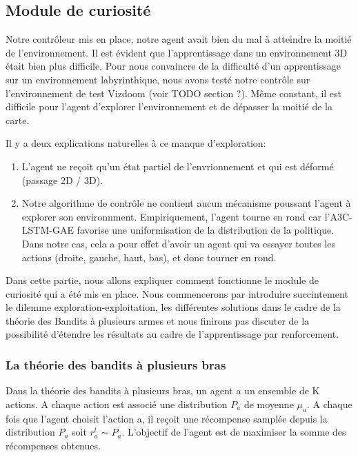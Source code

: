 \subsection{Module de curiosité}

Notre contrôleur mis en place, notre agent avait bien du mal à atteindre la moitié de l'environnement. Il est évident que l'apprentissage dans un environnement 3D était bien plus difficile. Pour nous convaincre de la difficulté d'un apprentissage sur un environnement labyrinthique, nous avons testé notre contrôle sur l'environnement de test Vizdoom (voir TODO section ?). Même constant, il est difficile pour l'agent d'explorer l'environnement et de dépasser la moitié de la carte.

Il y a deux explications naturelles à ce manque d'exploration:

\begin{enumerate}
\item L'agent ne reçoit qu'un état partiel de l'envrionnement et qui est déformé (passage 2D / 3D). 
\item Notre algorithme de contrôle ne contient aucun mécanisme poussant l'agent à explorer son environnment. Empiriquement, l'agent tourne en rond car l'A3C-LSTM-GAE favorise une uniformisation de la distribution de la politique. Dans notre cas, cela a pour effet d'avoir un agent qui va essayer toutes les actions (droite, gauche, haut, bas), et donc tourner en rond.
\end{enumerate}

Dans cette partie, nous allons expliquer comment fonctionne le module de curiosité qui a été mis en place. Nous commencerons par introduire succintement le dilemme exploration-exploitation, les différentes solutions dans le cadre de la théorie des Bandits à plusieurs armes et nous finirons pas discuter de la possibilité d'étendre les résultats au cadre de l'apprentissage par renforcement.

\subsubsection{La théorie des bandits à plusieurs bras}

Dans la théorie des bandits à plusieurs bras, un agent a un ensemble de K actions. A chaque action est associé une distribution $P_a$ de moyenne $\mu_a$. A chaque fois que l'agent choisit l'action a, il reçoit une récompense samplée depuis la distribution $P_a$ soit $r^t_a \sim P_a$. L'objectif de l'agent est de maximiser la somme des récompenses obtenues. 

